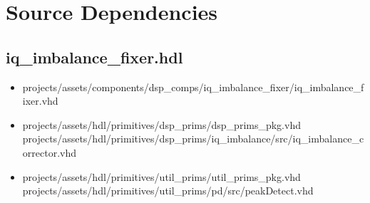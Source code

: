 \documentclass{article}
\def\comp{iq\_imbalance\_fixer}
\begin{document}
\newpage
\section*{Source Dependencies}
\subsection*{\comp.hdl}
	\begin{itemize}
		\item projects/assets/components/dsp\_comps/iq\_imbalance\_fixer/iq\_imbalance\_fixer.vhd
		\item projects/assets/hdl/primitives/dsp\_prims/dsp\_prims\_pkg.vhd
		      \subitem projects/assets/hdl/primitives/dsp\_prims/iq\_imbalance/src/iq\_imbalance\_corrector.vhd
		\item projects/assets/hdl/primitives/util\_prims/util\_prims\_pkg.vhd
		      \subitem projects/assets/hdl/primitives/util\_prims/pd/src/peakDetect.vhd
	\end{itemize}
\end{document}
